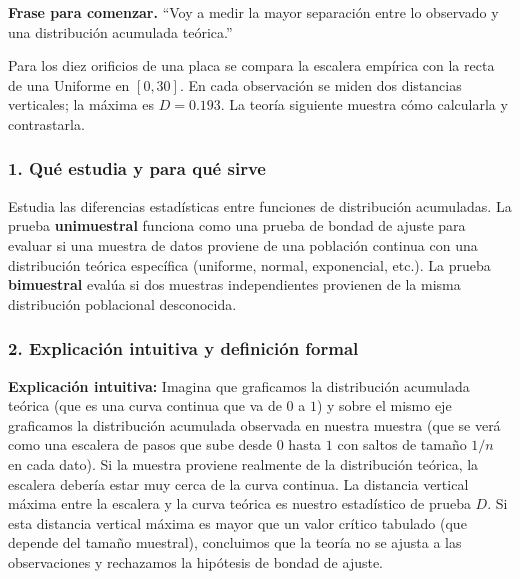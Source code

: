 \documentclass[11pt,a4paper]{article}
\newcommand{\inicio}[1]{\textbf{Frase para comenzar.} ``#1''\par}
\begin{document}
\inicio{Voy a medir la mayor separación entre lo observado y una distribución acumulada teórica.}
\begin{idea}
Para los diez orificios de una placa se compara la escalera empírica con la recta de una Uniforme en $[0,30]$. En cada observación se miden dos distancias verticales; la máxima es $D=0.193$. La teoría siguiente muestra cómo calcularla y contrastarla.
\end{idea}

\subsubsection{1. Qué estudia y para qué sirve}
Estudia las diferencias estadísticas entre funciones de distribución acumuladas. La prueba \textbf{unimuestral} funciona como una prueba de bondad de ajuste para evaluar si una muestra de datos proviene de una población continua con una distribución teórica específica (uniforme, normal, exponencial, etc.). La prueba \textbf{bimuestral} evalúa si dos muestras independientes provienen de la misma distribución poblacional desconocida.

\subsubsection{2. Explicación intuitiva y definición formal}
\textbf{Explicación intuitiva:} Imagina que graficamos la distribución acumulada teórica (que es una curva continua que va de $0$ a $1$) y sobre el mismo eje graficamos la distribución acumulada observada en nuestra muestra (que se verá como una escalera de pasos que sube desde $0$ hasta $1$ con saltos de tamaño $1/n$ en cada dato). Si la muestra proviene realmente de la distribución teórica, la escalera debería estar muy cerca de la curva continua. La distancia vertical máxima entre la escalera y la curva teórica es nuestro estadístico de prueba $D$. Si esta distancia vertical máxima es mayor que un valor crítico tabulado (que depende del tamaño muestral), concluimos que la teoría no se ajusta a las observaciones y rechazamos la hipótesis de bondad de ajuste.
\end{document}
